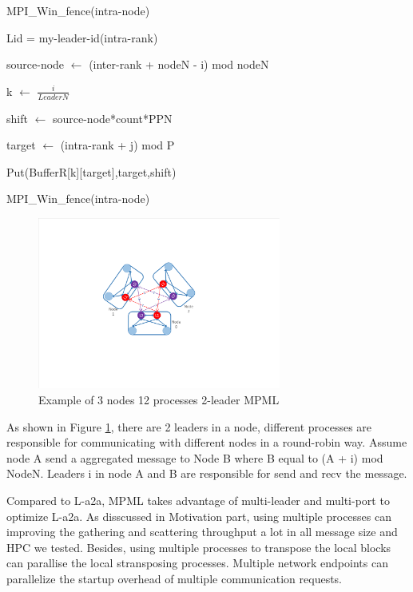 \begin{algorithm}
{}
{
	MPI\_Win\_fence(intra-node)

	{
		Lid = my-leader-id(intra-rank)

		{
			source-node $\leftarrow$ (inter-rank + nodeN - i) mod nodeN

			k $\leftarrow$ $\frac{i}{LeaderN}$

			shift $\leftarrow$ source-node*count*PPN

			{
				target $\leftarrow$ (intra-rank + j) mod P

				Put(BufferR[k][target],target,shift)
			}

		}
	}

	MPI\_Win\_fence(intra-node)
}
\end{algorithm}

\begin{figure}
\centering
\includegraphics[width=8cm]{./Figures/multi-leader-multi-port-a2a.pdf} %
\caption{Example of 3 nodes 12 processes 2-leader MPML} %
\label{fig:MPML}
\end{figure}
As shown in Figure \ref{fig:MPML}, there are 2 leaders in a node, different processes are responsible for communicating with different nodes in a round-robin way.
Assume node A send a aggregated message to Node B where B equal to (A + i) mod NodeN.
Leaders i in node A and B are responsible for send and recv the message.


Compared to L-a2a, MPML takes advantage of multi-leader and multi-port to optimize L-a2a.
As disscussed in Motivation part, using multiple processes can improving the gathering and scattering throughput a lot in all message size and HPC we tested. 
Besides, using multiple processes to transpose the local blocks can parallise the local stransposing processes.
Multiple network endpoints can parallelize the startup overhead of multiple communication requests.


